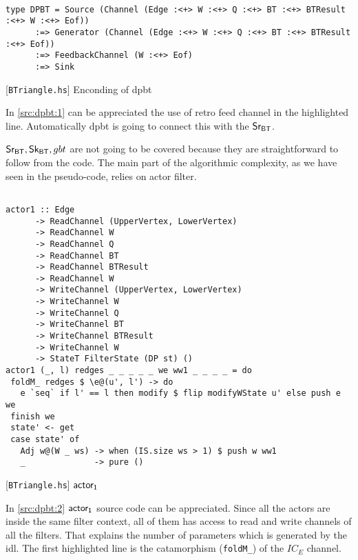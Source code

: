 \begin{listing}[H]
\begin{verbatim}

type DPBT = Source (Channel (Edge :<+> W :<+> Q :<+> BT :<+> BTResult :<+> W :<+> Eof))
      :=> Generator (Channel (Edge :<+> W :<+> Q :<+> BT :<+> BTResult :<+> Eof))
      :=> FeedbackChannel (W :<+> Eof)
      :=> Sink

\end{verbatim}
\caption{[\texttt{BTriangle.hs}] Enconding of \acrshort{dpbt}}
\label{src:dpbt:1}
\end{listing}

In \autoref{src:dpbt:1} can be appreciated the use of retro feed channel in the highlighted line. 
Automatically \acrshort{dpbt} is going to connect this with the $\mathsf{Sr_{BT}}$.

$\mathsf{Sr_{BT}}, \mathsf{Sk_{BT}}, gbt$ are not going to be covered because they are straightforward to follow from the code. 
The main part of the algorithmic complexity, as we have seen in the pseudo-code, relies on actor filter.

\begin{listing}[H]
\begin{verbatim}

actor1 :: Edge
      -> ReadChannel (UpperVertex, LowerVertex)
      -> ReadChannel W
      -> ReadChannel Q
      -> ReadChannel BT
      -> ReadChannel BTResult
      -> ReadChannel W
      -> WriteChannel (UpperVertex, LowerVertex)
      -> WriteChannel W
      -> WriteChannel Q
      -> WriteChannel BT
      -> WriteChannel BTResult
      -> WriteChannel W
      -> StateT FilterState (DP st) ()
actor1 (_, l) redges _ _ _ _ _ we ww1 _ _ _ _ = do
 foldM_ redges $ \e@(u', l') -> do
   e `seq` if l' == l then modify $ flip modifyWState u' else push e we
 finish we
 state' <- get
 case state' of
   Adj w@(W _ ws) -> when (IS.size ws > 1) $ push w ww1
   _              -> pure ()

\end{verbatim}
\caption{[\texttt{BTriangle.hs}] $\aaa$}
\label{src:dpbt:2}
\end{listing}

In \autoref{src:dpbt:2} $\mathsf{actor_1}$ source code can be appreciated. Since all the actors are inside the same filter context, all of them has access to read and write
channels of all the filters. That explains the number of parameters which is generated by the \acrshort{idl}.
The first highlighted line is the catamorphism (\texttt{foldM_}) of the $IC_E$ channel. 


